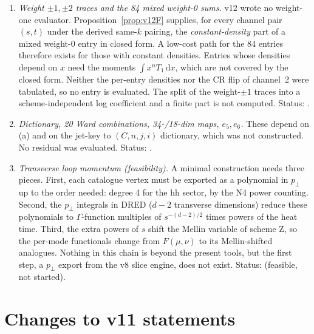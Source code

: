 \begin{enumerate}[label=(\alph*)]
\item \emph{Weight \(\pm1,\pm2\) traces and the 84 mixed weight-0
sums.} v12 wrote no weight-one evaluator. Proposition~\ref{prop:v12F}
supplies, for every channel pair \((s,t)\) under the derived same-\(k\)
pairing, the \emph{constant-density} part of a mixed weight-0 entry
in closed form. A low-cost path for the 84 entries therefore exists
for those with constant densities. Entries whose densities depend on
\(x\) need the moments \(\int x^nT_1\,\mathrm dx\), which are not
covered by the closed form. Neither the per-entry densities nor the
CR flip of channel~2 were tabulated, so no entry is evaluated. The
split of the weight-\(\pm1\) traces into a scheme-independent log
coefficient and a finite part is not computed. Status: \OPEN.
\item \emph{Dictionary, 20 Ward combinations, 34-/18-dim maps,
\(e_5,e_6\).} These depend on (a) and on the jet-key to \((C,n,j,i)\)
dictionary, which was not constructed. No residual was evaluated.
Status: \OPEN.
\item \emph{Transverse loop momentum (feasibility).} A minimal
construction needs three pieces. First, each catalogue vertex must
be exported as a polynomial in \(p_\perp\) up to the order needed:
degree 4 for the hh sector, by the N4 power counting. Second, the
\(p_\perp\) integrals in DRED (\(d-2\) transverse dimensions) reduce
these polynomials to \(\Gamma\)-function multiples of
\(s^{-(d-2)/2}\) times powers of the heat time. Third, the extra
powers of \(s\) shift the Mellin variable of scheme Z, so the
per-mode functionals change from \(F(\mu,\nu)\) to its Mellin-shifted
analogues. Nothing in this chain is beyond the present tools, but the
first step, a \(p_\perp\) export from the v8 slice engine, does not
exist. Status: \OPEN{} (feasible, not started).
\end{enumerate}

\section{Changes to v11 statements}
\label{sec:v12changes}

